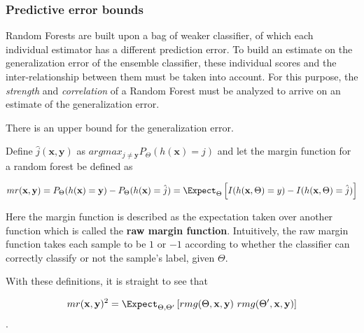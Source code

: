 \subsubsection{Predictive error bounds}

Random Forests are built upon a bag of weaker classifier, of which each individual estimator has a different prediction error. To build an estimate on the generalization error of the ensemble classifier, these individual scores and the inter-relationship between them must be taken into account. For this purpose, the \textit{strength} and \textit{correlation} of a Random Forest must be analyzed to arrive on an estimate of the generalization error.


\begin{theorem}
	There is an upper bound for the generalization error.
\end{theorem}

Define $\hat{j}(\textbf{x},\textbf{y})$ as $arg max_{j\neq \textbf{y}} P_{\Theta}(h(\textbf{x}) = j)$ and let the margin function for a random forest be defined as

\begin{equation}\label{eq:rf-marginFunRf}
mr(\textbf{x},\textbf{y}) =  P_{\Theta}(h(\textbf{x}) = \textbf{y}) - P_{\Theta}(h(\textbf{x}) = \hat{j}) 
\\ 
= \Expect_{\Theta} \left[  I(h(\textbf{x},\Theta ) = y ) - I( h( \textbf{x},\Theta ) = \hat{j} )  \right]
\end{equation} 




Here the margin function is described as the expectation taken over another function which is called the \textbf{raw margin function}\label{eq:rf-rawMarginFun}. Intuitively, the raw margin function takes each sample to be $1$ or $-1$ according to whether the classifier can correctly classify or not the sample's label, given $\Theta$.

With these definitions, it is straight to see that 

$$mr( \textbf{x},\textbf{y} )^2 = \Expect_{\Theta, \Theta'} \left[ rmg( \Theta,\textbf{x},\textbf{y} ) \ rmg(\Theta',\textbf{x},\textbf{y} )  \right] $$.

